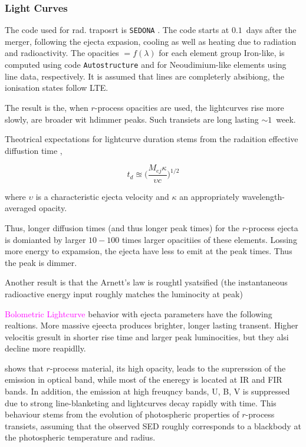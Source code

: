 \documentclass[11pt,a4paper,headinclude=true,DIV=14,BCOR=8mm,chapterprefix,listof=totoc,twoside,openright,abstracton]{scrbook}
\newcommand{\magenta}[1]{\textcolor{magenta}{#1}} %
\begin{document}

\subsubsection{Light Curves}

The code used for rad. traposrt is \texttt{SEDONA} \cite{(Kasen et al. 2006}. The code starts at $0.1$~days after the merger, following the ejecta expasion, cooling as well as heating due to radiation and radioactivity. The opacities $=f(\lambda)$ for each element group Iron-like,  is computed using code \texttt{Autostructure} and for Neoudimium-like elements using \cite{Kurucz & Bell (1995a)} line data, respectively.
It is assumed that lines are completerly absibiong, the ionisation states follow LTE.

The result is the, when $r$-process opacities are used, the lightcurves rise more slowly, are broader wit hdimmer peaks. Such transiets are long lasting $\sim 1$~week.

Theotrical expectations for lightcurve duration stems from the radaition effective diffustion time \cite{(Arnett 1979)},

\begin{equation}
    t_d \approxeq \Big( \frac{M_{ej} \kappa}{ \upsilon c} \Big)^{1/2}
\end{equation}

where $\upsilon$ is a characteristic ejecta velocity and $\kappa$ an appropriately wavelength-averaged opacity.

Thus, longer diffusion times (and thus longer peak times) for the $r$-process ejecta is domianted by larger $10-100$ times larger opacitiies of these elements. Lossing more energy to expamsion, the ejecta have less to emit at the peak times. Thus the peak is dimmer. 

Another result is that the Arnett's law is roughtl ysatsified (the instantaneous radioactive energy input roughly matches the luminocity at peak) \cite{(Arnett 1979, 1982).}

\magenta{Bolometric Lightcurve} behavior with ejecta parameters have the following realtions. More massive ejeecta produces brighter, longer lasting transent. Higher velocitis gresult in shorter rise time and larger peak luminocities, but they alsi decline more reapidlly.

 shows that $r$-process material, its high opacity, leads to the suprerssion of the emission in optical band, while most of the eneregy is located at IR and FIR bands. In addition, the emission at high freuqncy bands, U, B, V is suppressed due to strong line-blanketing and lightcurves decay rapidly with time. This behaviour stems from the evolution of photospheric properties of $r$-process transiets, assuming that the observed SED roughly corresponds to a blackbody at the photospheric temperature and radius.
\end{document}

